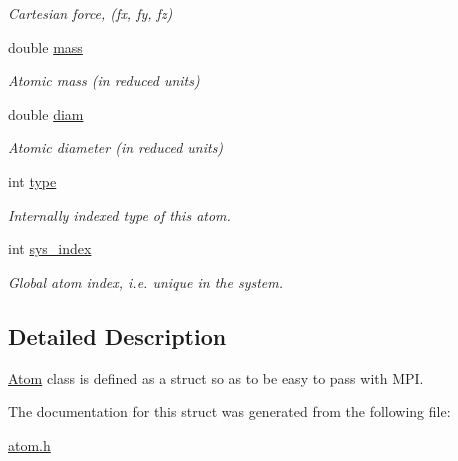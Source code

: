 \begin{DoxyCompactItemize}
\begin{DoxyCompactList}\small\item\em Cartesian force, (fx, fy, fz) \end{DoxyCompactList}\item 
\hypertarget{structatom_1_1Atom_ae6421dce659064f837aa5afad53b07db}{double \hyperlink{structatom_1_1Atom_ae6421dce659064f837aa5afad53b07db}{mass}}\label{structatom_1_1Atom_ae6421dce659064f837aa5afad53b07db}

\begin{DoxyCompactList}\small\item\em Atomic mass (in reduced units) \end{DoxyCompactList}\item 
\hypertarget{structatom_1_1Atom_ab5c7879119b1dbd1c2f6f2b3bd995bd2}{double \hyperlink{structatom_1_1Atom_ab5c7879119b1dbd1c2f6f2b3bd995bd2}{diam}}\label{structatom_1_1Atom_ab5c7879119b1dbd1c2f6f2b3bd995bd2}

\begin{DoxyCompactList}\small\item\em Atomic diameter (in reduced units) \end{DoxyCompactList}\item 
\hypertarget{structatom_1_1Atom_a1de1a9006c51194e98f077e4caf6971b}{int \hyperlink{structatom_1_1Atom_a1de1a9006c51194e98f077e4caf6971b}{type}}\label{structatom_1_1Atom_a1de1a9006c51194e98f077e4caf6971b}

\begin{DoxyCompactList}\small\item\em Internally indexed type of this atom. \end{DoxyCompactList}\item 
\hypertarget{structatom_1_1Atom_a668df1e955b0cf6bd22ad7a2f80cac5e}{int \hyperlink{structatom_1_1Atom_a668df1e955b0cf6bd22ad7a2f80cac5e}{sys\-\_\-index}}\label{structatom_1_1Atom_a668df1e955b0cf6bd22ad7a2f80cac5e}

\begin{DoxyCompactList}\small\item\em Global atom index, i.\-e. unique in the system. \end{DoxyCompactList}\end{DoxyCompactItemize}


\subsection{Detailed Description}
\hyperlink{structatom_1_1Atom}{Atom} class is defined as a struct so as to be easy to pass with M\-P\-I. 

The documentation for this struct was generated from the following file\-:\begin{DoxyCompactItemize}
\item 
\hyperlink{atom_8h}{atom.\-h}\end{DoxyCompactItemize}
